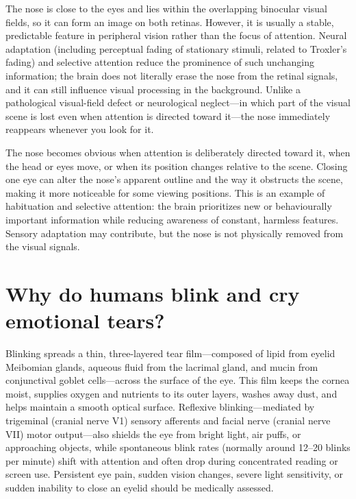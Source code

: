 \documentclass[11pt,oneside]{report}
\begin{document}
The nose is close to the eyes and lies within the overlapping binocular visual
fields, so it can form an image on both retinas. However, it is usually a
stable, predictable feature in peripheral vision rather than the focus of
attention. Neural adaptation (including perceptual fading of stationary stimuli,
related to Troxler's fading) and selective attention reduce the prominence of
such unchanging information; the brain does not literally erase the nose from
the retinal signals, and it can still influence visual processing in the
background. Unlike a pathological visual-field defect or neurological neglect—in
which part of the visual scene is lost even when attention is directed toward
it—the nose immediately reappears whenever you look for it.

The nose becomes obvious when attention is deliberately directed toward it,
when the head or eyes move, or when its position changes relative to the scene.
Closing one eye can alter the nose's apparent outline and the way it obstructs
the scene, making it more noticeable for some viewing positions. This is an
example of habituation and selective attention: the brain prioritizes new or
behaviourally important information while reducing awareness of constant,
harmless features. Sensory adaptation may contribute, but the nose is not
physically removed from the visual signals.

\section{Why do humans blink and cry emotional tears?}

Blinking spreads a thin, three-layered tear film---composed of lipid from
eyelid Meibomian glands, aqueous fluid from the lacrimal gland, and mucin from
conjunctival goblet cells---across the surface of the eye. This film keeps the
cornea moist, supplies oxygen and nutrients to its outer layers, washes away
dust, and helps maintain a smooth optical surface. Reflexive blinking—mediated
by trigeminal (cranial nerve V1) sensory afferents and facial nerve (cranial
nerve VII) motor output—also shields the eye from bright light, air puffs, or
approaching objects, while spontaneous blink rates (normally around 12--20
blinks per minute) shift with attention and often drop during concentrated
reading or screen use. Persistent eye pain,
sudden vision changes, severe light sensitivity, or sudden inability to close
an eyelid should be medically assessed.
\end{document}
